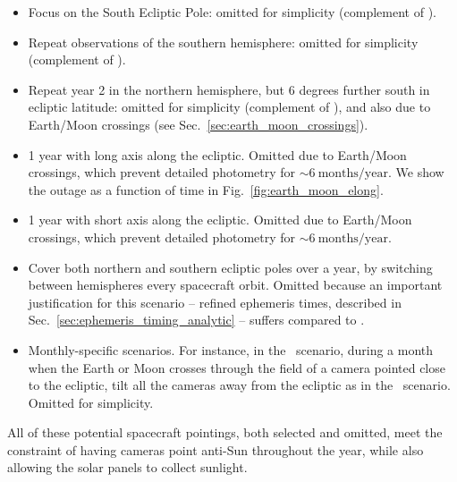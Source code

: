 \begin{itemize}
	\item Focus on the South Ecliptic Pole: omitted for simplicity (complement of \npole).
	\item Repeat observations of the southern hemisphere: omitted for simplicity (complement of \nhemi).
	\item Repeat year 2 in the northern hemisphere, but 6 degrees further south in ecliptic latitude: omitted for simplicity (complement of \shemiAvoid), and also due to Earth/Moon crossings (see Sec.~\ref{sec:earth_moon_crossings}).
	\item 1 year with \tesss long axis along the ecliptic. Omitted due to Earth/Moon crossings, which prevent detailed photometry for $\sim\!6\ \text{months/year}$.
	We show the outage as a function of time in Fig.~\ref{fig:earth_moon_elong}.
	\item 1 year with \tesss short axis along the ecliptic. Omitted due to Earth/Moon crossings, which prevent detailed photometry for $\sim 6\ \text{months/year}$.
	\item Cover both northern and southern ecliptic poles over a year, by switching between hemispheres every spacecraft orbit. Omitted because an important justification for this scenario -- refined ephemeris times, described in Sec.~\ref{sec:ephemeris_timing_analytic} -- suffers compared to \hemis.
	\item Monthly-specific scenarios. For instance, in the \nhemi\ scenario, during a month when the Earth or Moon crosses through the field of a camera pointed close to the ecliptic, tilt all the cameras away from the ecliptic as in the \npole\ scenario. Omitted for simplicity.
\end{itemize}


All of these potential spacecraft pointings, both selected and omitted, meet the constraint of having \tesss cameras point anti-Sun throughout the year, while also allowing the solar panels to collect sunlight.